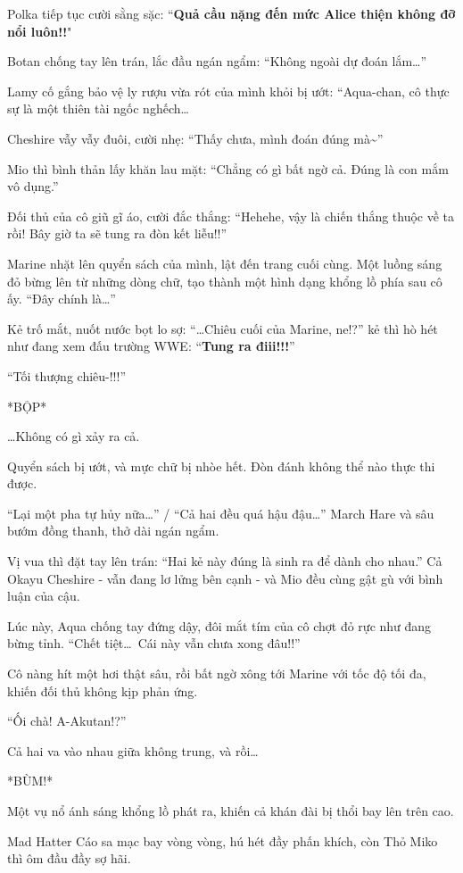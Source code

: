 \documentclass[../main.tex]{subfiles}
\begin{document}
Polka tiếp tục cười sằng sặc: ``\textbf{Quả cầu nặng đến mức Alice thiện không đỡ nổi luôn!!}"

Botan chống tay lên trán, lắc đầu ngán ngẩm: ``Không ngoài dự đoán lắm\dots''

Lamy cố gắng bảo vệ ly rượu vừa rót của mình khỏi bị ướt: ``Aqua-chan, cô thực sự là một thiên tài ngốc nghếch\dots

Cheshire vẫy vẫy đuôi, cười nhẹ: ``Thấy chưa, mình đoán đúng mà\~{}''

Mio thì bình thản lấy khăn lau mặt: ``Chẳng có gì bất ngờ cả. Đúng là con mắm vô dụng.''

Đối thủ của cô giũ gĩ áo, cười đắc thắng: ``Hehehe, vậy là chiến thắng thuộc về ta rồi! Bây giờ ta sẽ tung ra đòn kết liễu!!''

Marine nhặt lên quyển sách của mình, lật đến trang cuối cùng. Một luồng sáng đỏ bừng lên từ những dòng chữ, tạo thành một hình dạng khổng lồ phía sau cô ấy. ``Đây chính là\dots''

Kẻ trố mắt, nuốt nước bọt lo sợ: ``\dots Chiêu cuối của Marine, ne!?'' kẻ thì hò hét như đang xem đấu trường WWE: ``\textbf{Tung ra điii!!!}''

``Tối thượng chiêu-!!!''

*BỘP*

\dots Không có gì xảy ra cả.

Quyển sách bị ướt, và mực chữ bị nhòe hết. Đòn đánh không thể nào thực thi được.

``Lại một pha tự hủy nữa\dots'' / ``Cả hai đều quá hậu đậu\dots'' March Hare và sâu bướm đồng thanh, thở dài ngán ngẩm.

Vị vua thì đặt tay lên trán: ``Hai kẻ này đúng là sinh ra để dành cho nhau.'' Cả Okayu Cheshire - vẫn đang lơ lửng bên cạnh - và Mio đều cùng gật gù với bình luận của cậu.

Lúc này, Aqua chống tay đứng dậy, đôi mắt tím của cô chợt đỏ rực như đang bừng tỉnh. ``Chết tiệt\dots\ Cái này vẫn chưa xong đâu!!''

Cô nàng hít một hơi thật sâu, rồi bất ngờ xông tới Marine với tốc độ tối đa, khiến đối thủ không kịp phản ứng.

``Ối chà! A-Akutan!?''

Cả hai va vào nhau giữa không trung, và rồi\dots

*BÙM!*

Một vụ nổ ánh sáng khổng lồ phát ra, khiến cả khán đài bị thổi bay lên trên cao.

Mad Hatter Cáo sa mạc bay vòng vòng, hú hét đầy phấn khích, còn Thỏ Miko thì ôm đầu đầy sợ hãi.
\end{document}
